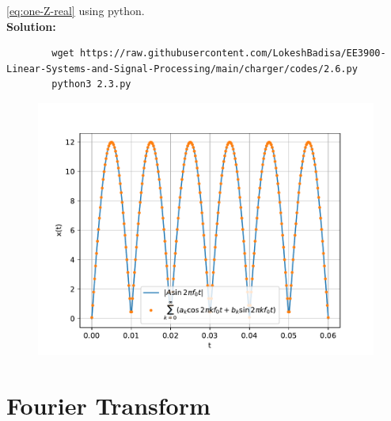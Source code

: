 \documentclass[journal,12pt,twocolumn]{IEEEtran}
\newcommand{\solution}{\noindent \textbf{Solution: }}
\numberwithin{equation}{section}
\renewcommand\thesection{\arabic{section}}
\begin{document}
\begin{enumerate}[label=\thesection.\arabic*,ref=\thesection.\theenumi]
    \eqref{eq:one-Z-real}
    using python.\\
     \solution 
        \begin{lstlisting}
        wget https://raw.githubusercontent.com/LokeshBadisa/EE3900-Linear-Systems-and-Signal-Processing/main/charger/codes/2.6.py
        python3 2.3.py
        \end{lstlisting}
          \begin{figure}[!ht]
			\centering
			\includegraphics[width=\columnwidth]{./figs/2.6}
			\caption{}
\end{figure}
    \end{enumerate}
    \section{Fourier Transform}
 
\end{document}
